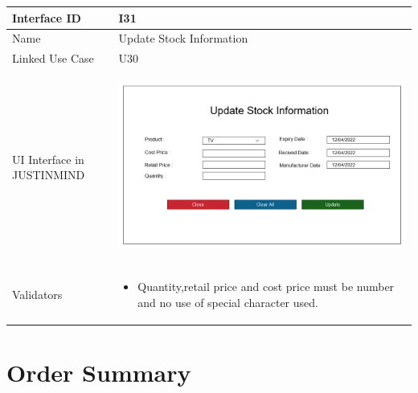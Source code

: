\documentclass[12pt,a4paper]{report}
\begin{document}
\begin{tabular}{ | m{3cm} | m{12cm}| } \hline

Interface ID & I31  \\\hline

Name  &Update Stock Information\\ \hline

Linked Use Case & U30	 \\ \hline

UI Interface in JUSTINMIND & \begin{center} \includegraphics[scale=0.3]{./User Interface/UI-030Update Stock Information.png}\end{center}  \\ \hline

Validators & 
\begin{itemize}
\item   Quantity,retail price and cost price must be number and no use of special character used. 
\end{itemize}
\\ \hline
\end{tabular}
\section{Order Summary}
\end{document}
